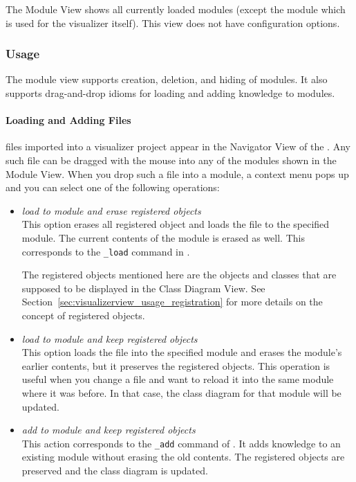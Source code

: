 The \FVIZ Module View shows all currently loaded \FLORA modules (except the
module which is used for the visualizer itself).
This view does not have configuration options.

\subsubsection{Usage}
\label{sec:moduleview_usage}

The module view supports
creation, deletion, and hiding of \FLORA modules. It also supports
drag-and-drop idioms for loading and adding \FLORA knowledge to modules.

\paragraph{Loading and Adding Files}
\label{sec:moduleview_usage_loadingandadding}

\FLORA files imported into a visualizer project appear in the Navigator
View of the \FVIZ. Any such file can be dragged with the mouse into any of the
modules shown in the Module View. When you drop such a file into a module,
a context menu pops up and you can select one of the following operations:

\begin{itemize}
\item \emph{load to module and erase registered objects}\\
  This option erases all registered object and loads the file to the
  specified module. The current contents of the module is erased as well.
  This corresponds to the {\tt \_load} command in \FLORA.

  The registered objects mentioned here are the objects and classes that
  are supposed to be displayed in the \FVIZ Class Diagram View. See
  Section~\ref{sec:visualizerview_usage_registration} for more details on
  the concept of registered objects.

\item \emph{load to module and keep registered objects}\\
  This option loads the file into the specified module and erases the
  module's earlier contents, but it preserves the registered objects.
  This operation is useful when you change a \FLORA file and want to reload
  it into the same module where it was before. In that case, the class
  diagram for that module will be updated.

\item \emph{add to module and keep registered objects}\\
  This action corresponds to the {\tt \_add} command of \FLORA. It adds
  knowledge to an existing module without erasing the old contents.
  The registered objects are preserved and the class diagram is updated.
\end{itemize}


